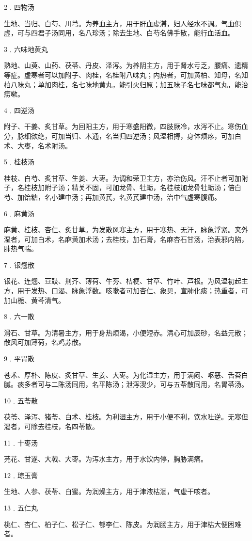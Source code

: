 \documentclass[12pt,UTF8]{ctexbook}
\begin{document}
2﹒四物汤

生地、当归、白芍、川芎。为养血主方，用于肝血虚滞，妇人经水不调。气血俱虚，可与四君子汤同用，名八珍汤；除去生地、白芍名佛手散，能行血活血。

3﹒六味地黄丸

熟地、山萸、山药、茯苓、丹皮、泽泻。为养阴主方，用于肾水亏乏，腰痛、遗精等症。虚寒者可以加附子、肉桂，名桂附八味丸；内热者，可加黄柏、知母，名知柏八味丸；单加肉桂，名七味地黄丸，能引火归原；加五味子名七味都气丸，能治痨嗽。

4﹒四逆汤

附子、干姜、炙甘草。为回阳主方，用于寒盛阳微，四肢厥冷，水泻不止。寒伤血分，脉细欲绝，可加当归、木通，名当归四逆汤；风湿相搏，身体烦疼，可加白术、大枣，名术附汤。

5﹒桂枝汤

桂枝、白芍、炙甘草、生姜、大枣。为调和荣卫主方，亦治伤风。汗不止者可加附子，名桂枝加附子汤；精关不固，可加龙骨、牡蛎，名桂枝加龙骨牡蛎汤；倍白芍、加饴糖，名小建中汤；再加黄芪，名黄芪建中汤，治中气虚寒腹痛。

6﹒麻黄汤

麻黄、桂枝、杏仁、炙甘草。为发散风寒主方，用于寒热、无汗，脉象浮紧。夹外湿者，可加白术，名麻黄加术汤；去桂枝，加石膏，名麻杏石甘汤，治表邪内陷，肺热气喘。

7﹒银翘散

银花、连翘、豆豉、荆芥、薄荷、牛蒡、桔梗、甘草、竹叶、芦根。为风温初起主方，用于发热、口渴、脉象浮数。咳嗽者可加杏仁、象贝，宣肺化痰；热重者，可加山栀、黄芩清气。

8﹒六一散

滑石、甘草。为清暑主方，用于身热烦渴，小便短赤。清心可加辰砂，名益元散；散风可加薄荷，名鸡苏散。

9﹒平胃散

苍术、厚朴、陈皮、炙甘草、生姜、大枣。为化湿主方，用于满闷、呕恶、舌苔白腻。痰多者可与二陈汤同用，名平陈汤；泄泻溲少，可与五苓散同用，名胃苓汤。

10﹒五苓散

茯苓、泽泻、猪苓、白术、桂枝。为利湿主方，用于小便不利，饮水吐逆。无寒但渴者，可除去桂枝，名四苓散。

11﹒十枣汤

芫花、甘遂、大戟、大枣。为泻水主方，用于水饮内停，胸胁满痛。

12﹒琼玉膏

生地、人参、茯苓、白蜜。为润燥主方，用于津液枯涸，气虚干咳者。

13﹒五仁丸

桃仁、杏仁、柏子仁、松子仁、郁李仁、陈皮。为润肠主方，用于津枯大便困难者。
\end{document}
